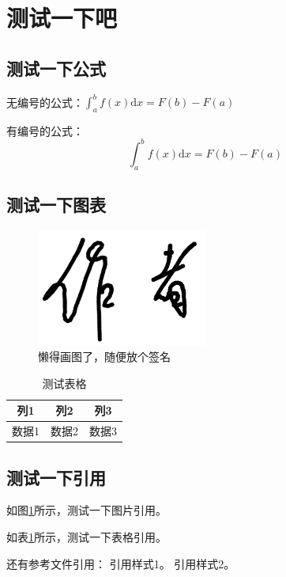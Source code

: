 
\section{测试一下吧}

\subsection{测试一下公式}

无编号的公式：$\int_a^b f(x)\mathrm{d}x=F(b)-F(a)$

有编号的公式：
\begin{equation}
    \int_a^b f(x)\mathrm{d}x=F(b)-F(a)
\end{equation}

\subsection{测试一下图表}

\begin{figure}[htbp]
    \centering
    \includegraphics[width=0.5\textwidth]{signatures/author.png}
    \caption{懒得画图了，随便放个签名}
    \label{fig:example}
\end{figure}

\begin{table}[htbp]
    \centering
    \caption{测试表格}
    \begin{tabular}{|c|c|c|}
        \hline
        列1  & 列2  & 列3  \\
        \hline
        数据1 & 数据2 & 数据3 \\
        \hline
    \end{tabular}
    \label{tab:example}
\end{table}

\subsection{测试一下引用}

如图\ref{fig:example}所示，测试一下图片引用。

如表\ref{tab:example}所示，测试一下表格引用。

还有参考文件引用：
引用样式1\cite{example2025}。
引用样式2\parencite{example2025}。